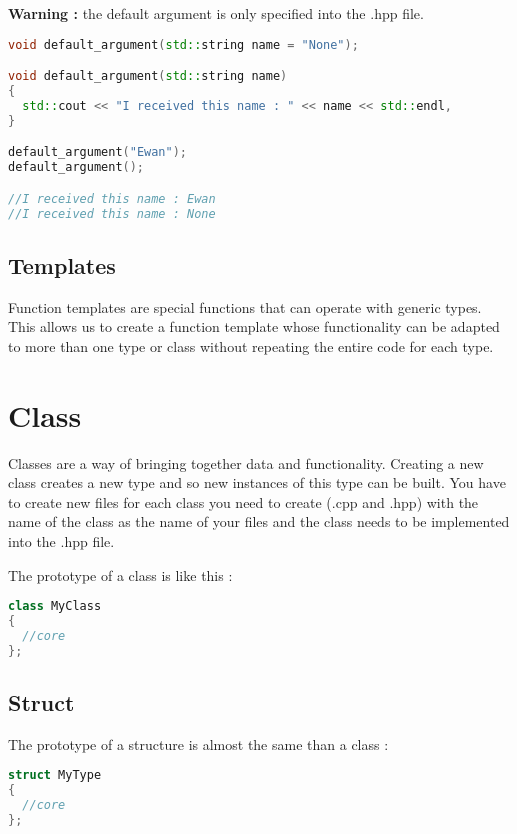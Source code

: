 \documentclass[a4paper, 12pt, titlepage]{scrartcl} %
\begin{document}
\textbf{Warning : } the default argument is only specified into the .hpp file. 

\begin{lstlisting}[language=C++]
void default_argument(std::string name = "None");

void default_argument(std::string name)
{
  std::cout << "I received this name : " << name << std::endl,
}

default_argument("Ewan");
default_argument();

//I received this name : Ewan
//I received this name : None
\end{lstlisting} \vspace{5mm}

\subsection{Templates}
Function templates are special functions that can operate with generic types. This allows us to create a function template whose functionality can be adapted to more than one type or class without repeating the entire code for each type.


\newpage
\section{Class}
Classes are a way of bringing together data and functionality. Creating a new class creates a new type and so new instances of this type can be built. You have to create new files for each class you need to create (.cpp and .hpp) with the name of the class as the name of your files and the class needs to be implemented into the .hpp file.

\vspace{5mm}

The prototype of a class is like this : 

\begin{lstlisting}[language=C++]
class MyClass
{
  //core
};
\end{lstlisting} \vspace{5mm}

\subsection{Struct}

The prototype of a structure is almost the same than a class :

\begin{lstlisting}[language=C++]
struct MyType
{
  //core
};
\end{lstlisting} \vspace{5mm}
\end{document}
